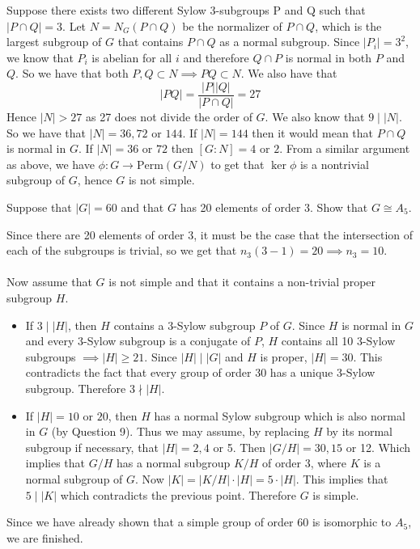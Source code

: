 \documentclass[12pt, answers]{exam}
\begin{document}
\begin{questions}
\begin{solution}
\begin{itemize}
                Suppose there exists two different Sylow 3-subgroups P and Q such that $|P \cap Q| = 3$. Let $N = N_G(P \cap Q)$ be the normalizer of $P \cap Q$, which is the largest subgroup of $G$ that contains $P \cap Q$ as a normal subgroup. Since $|P_i| = 3^2$, we know that $P_i$ is abelian for all $i$ and therefore $Q \cap P$ is normal in both $P$ and $Q$. So we have that both $P, Q \subset N \implies PQ \subset N$. We also have that
                \[ |PQ| = \frac{|P||Q|}{|P \cap Q|} = 27 \]
                Hence $|N| > 27$ as 27 does not divide the order of $G$. We also know that $9 \mathrel{|} |N|$. So we have that $|N| = 36, 72$ or $144$. If $|N| = 144$ then it would mean that $P \cap Q$ is normal in $G$. If $|N| = 36$ or $72$ then $[G \colon N] = 4$ or $2$. From a similar argument as above, we have $\phi\colon G \to \text{Perm}(G/N)$ to get that $\ker\phi$ is a nontrivial subgroup of $G$, hence $G$ is not simple.
            \end{itemize}
        \end{solution}
        \setcounter{question}{4}
        \question Suppose that $|G| = 60$ and that $G$ has 20 elements of order 3. Show that $G\cong A_5$.
        \begin{solution}
            Since there are 20 elements of order 3, it must be the case that the intersection of each of the subgroups is
            trivial, so we get that $n_3(3 - 1) = 20 \implies n_3 = 10$. \\ \\
            Now assume that $G$ is not simple and that it contains a non-trivial proper subgroup $H$.
            \begin{itemize}
                \item If $3 \mathrel{|} |H|$, then $H$ contains a $3$-Sylow subgroup $P$ of $G$. Since $H$ is normal in $G$
                      and every $3$-Sylow subgroup is a conjugate of $P$, $H$ contains all 10 3-Sylow subgroups
                      $\implies |H| \ge 21$. Since $|H| \mathrel{|} |G|$ and $H$ is proper, $|H| = 30$. This contradicts
                      the fact that every group of order 30 has a unique 3-Sylow subgroup. Therefore $3 \mathrel{\nmid} |H|$.
                \item If $|H| = 10$ or $20$, then $H$ has a normal Sylow subgroup which is also normal in $G$ (by Question 9).
                    Thus we may assume, by replacing $H$ by its normal subgroup if necessary, that $|H| = 2, 4$ or 5. Then
                    $|G / H| = 30, 15$ or 12. Which implies that $G / H$ has a normal subgroup $K / H$ of order 3, where
                    $K$ is a normal subgroup of $G$. Now $|K| = |K / H| \cdot |H| = 5 \cdot |H|$. This implies that
                    $5 \mathrel{|} |K|$ which contradicts the previous point. Therefore $G$ is simple.
            \end{itemize}
            Since we have already shown that a simple group of order 60 is isomorphic to $A_5$, we are finished.
        \end{solution}


\end{questions}
\end{document}

